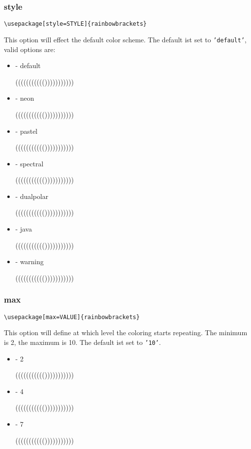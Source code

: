 \documentclass[10pt, a4paper]{article}
\newenvironment{itemizeexample}{
	\begin{itemize}
		\setlength\itemsep{-.5em}
	}
	{
	\end{itemize}
}
\begin{document}
	\subsubsection{style}\label{sub:style}
	\begin{lstlisting}[style=A]
			\usepackage[style=STYLE]{rainbowbrackets}
	\end{lstlisting}
	This option will effect the default color scheme. The default ist set to \texttt{'default'}, valid options are:
	\begin{itemizeexample}
		\item[-] default \begin{rb}((((((((((()))))))))))\end{rb}
		\item[-] neon \begin{rb}((((((((((()))))))))))\end{rb}
		\item[-] pastel \begin{rb}((((((((((()))))))))))\end{rb}
		\item[-] spectral \begin{rb}((((((((((()))))))))))\end{rb}
		\item[-] dualpolar \begin{rb}((((((((((()))))))))))\end{rb}
		\item[-] java \begin{rb}((((((((((()))))))))))\end{rb}
		\item[-] warning \begin{rb}((((((((((()))))))))))\end{rb}\rbresetstyle
	\end{itemizeexample}
	\subsubsection{max}
	\begin{lstlisting}[style=A]
			\usepackage[max=VALUE]{rainbowbrackets}
	\end{lstlisting}
	This option will define at which level the coloring starts repeating. The minimum is 2, the maximum is 10. The default ist set to \texttt{'10'}.
	\begin{itemizeexample}
		\item[-] 2 \begin{rb}((((((((((()))))))))))\end{rb}
		\item[-] 4 \begin{rb}((((((((((()))))))))))\end{rb}
		\item[-] 7 \begin{rb}((((((((((()))))))))))\end{rb}
	\end{itemizeexample}
\end{document}

